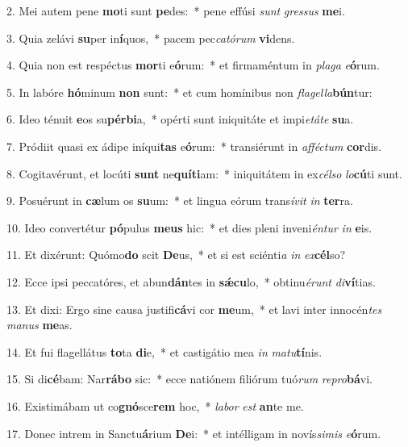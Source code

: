 2. Mei autem pene \textbf{mo}ti sunt \textbf{pe}des:~*  pene effúsi \textit{sunt} \textit{gres}\textit{sus} \textbf{me}i.\

3. Quia zelávi \textbf{su}per in\textbf{í}quos,~*  pacem pec\textit{ca}\textit{tó}\textit{rum} \textbf{vi}dens.\

4. Quia non est respéctus \textbf{mor}ti e\textbf{ó}rum:~*  et firmaméntum in \textit{pla}\textit{ga} \textit{e}\textbf{ó}rum.\

5. In labóre \textbf{hó}minum \textbf{non} sunt:~*  et cum homínibus non \textit{fla}\textit{gel}\textit{la}\textbf{bún}tur:\

6. Ideo ténuit \textbf{e}os su\textbf{pér}\textbf{bi}a,~*  opérti sunt iniquitáte et impi\textit{e}\textit{tá}\textit{te} \textbf{su}a.\

7. Pródiit quasi ex ádipe iníqui\textbf{tas} e\textbf{ó}rum:~*  transiérunt in \textit{af}\textit{féc}\textit{tum} \textbf{cor}dis.\

8. Cogitavérunt, et locúti \textbf{sunt} ne\textbf{quí}\textbf{ti}am:~*  iniquitátem in ex\textit{cél}\textit{so} \textit{lo}\textbf{cú}ti sunt.\

9. Posuérunt in \textbf{cæ}lum os \textbf{su}um:~*  et lingua eórum trans\textit{í}\textit{vit} \textit{in} \textbf{ter}ra.\

10. Ideo convertétur \textbf{pó}pulus \textbf{me}\textbf{us} hic:~*  et dies pleni inveni\textit{én}\textit{tur} \textit{in} \textbf{e}is.\

11. Et dixérunt: Quómo\textbf{do} scit \textbf{De}us,~*  et si est sciénti\textit{a} \textit{in} \textit{ex}\textbf{cél}so?\

12. Ecce ipsi peccatóres, et abun\textbf{dán}tes in \textbf{sǽ}\textbf{cu}lo,~*  obtinu\textit{é}\textit{runt} \textit{di}\textbf{ví}tias.\

13. Et dixi: Ergo sine causa justifi\textbf{cá}vi cor \textbf{me}um,~*  et lavi inter innocén\textit{tes} \textit{ma}\textit{nus} \textbf{me}as.\

14. Et fui flagellátus \textbf{to}ta \textbf{di}e,~*  et castigátio mea \textit{in} \textit{ma}\textit{tu}\textbf{tí}nis.\

15. Si di\textbf{cé}bam: Nar\textbf{rá}\textbf{bo} sic:~*  ecce natiónem filiórum tuó\textit{rum} \textit{re}\textit{pro}\textbf{bá}vi.\

16. Existimábam ut co\textbf{gnó}sce\textbf{rem} hoc,~*  \textit{la}\textit{bor} \textit{est} \textbf{an}te me.\

17. Donec intrem in Sanctu\textbf{á}rium \textbf{De}i:~*  et intélligam in novís\textit{si}\textit{mis} \textit{e}\textbf{ó}rum.\

